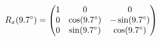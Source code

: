 \documentclass[preview]{standalone}
\begin{document}
\begin{align*}
\special{dvisvgm:raw <g id='unique000'>}R_x(9.7^\circ) = \begin{pmatrix} 1 & 0 & 0 \\ 0 & \cos(9.7^\circ) & -\sin(9.7^\circ) \\ 0 & \sin(9.7^\circ) & \cos(9.7^\circ) \end{pmatrix}\special{dvisvgm:raw </g>}
\end{align*}
\end{document}
